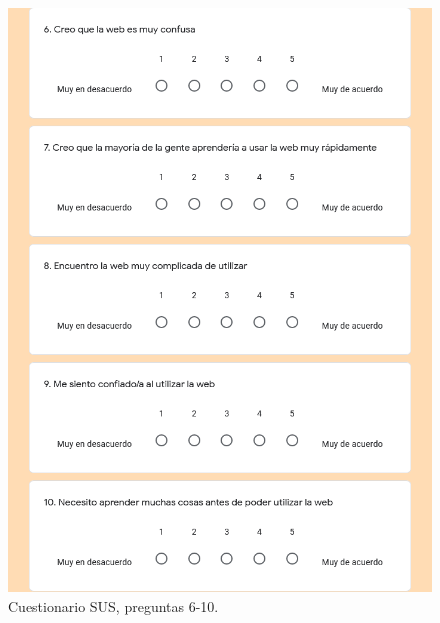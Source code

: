 \begin{figure}[h!]
	\centering
	\includegraphics[width=\linewidth]{Imagenes/Bitmap/Valoracion_general_sus2}
	\caption{Cuestionario SUS, preguntas 6-10.}
	\label{fig:valoraciongeneralsus2}
\end{figure}




